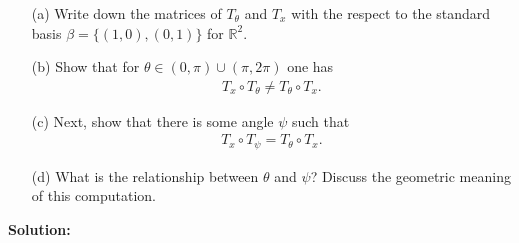 \documentclass{article}
\begin{document}
\begin{itemize}
    \item[(a)] Write down the matrices of $T_{\theta}$ and $T_x$ with the respect to the standard basis $\beta = \{(1,0),(0,1)\}$ for $\mathbb{R}^2$.

    \item[(b)] Show that for $\theta \in (0,\pi) \cup (\pi,2\pi)$ one has
    \begin{align*}
    T_x \circ T_{\theta} \neq T_{\theta} \circ T_x.
    \end{align*}

    \item[(c)] Next, show that there is some angle $\psi$ such that
    \begin{align*}
    T_x \circ T_{\psi} = T_{\theta} \circ T_x.
    \end{align*}

    \item[(d)] What is the relationship between $\theta$ and $\psi$? Discuss the geometric meaning of this computation.
\end{itemize}

\textbf{Solution: }\\



\newpage
\end{document}
